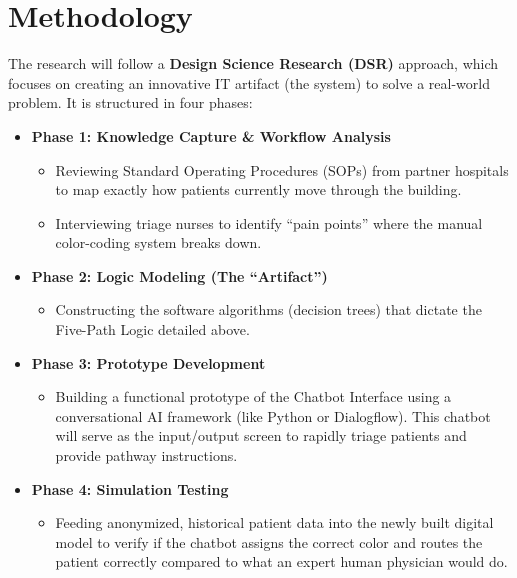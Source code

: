 \documentclass[12pt, a4paper]{article}
\begin{document}
	\section{Methodology}
	The research will follow a \textbf{Design Science Research (DSR)} approach, which focuses on creating an innovative IT artifact (the system) to solve a real-world problem. It is structured in four phases:
	
	\begin{itemize}
		\item \textbf{Phase 1: Knowledge Capture \& Workflow Analysis}
		\begin{itemize}
			\item Reviewing Standard Operating Procedures (SOPs) from partner hospitals to map exactly how patients currently move through the building.
			\item Interviewing triage nurses to identify ``pain points'' where the manual color-coding system breaks down.
		\end{itemize}
		
		\item \textbf{Phase 2: Logic Modeling (The ``Artifact'')}
		\begin{itemize}
			\item Constructing the software algorithms (decision trees) that dictate the Five-Path Logic detailed above.
		\end{itemize}
		
		\item \textbf{Phase 3: Prototype Development}
		\begin{itemize}
			\item Building a functional prototype of the Chatbot Interface using a conversational AI framework (like Python or Dialogflow). This chatbot will serve as the input/output screen to rapidly triage patients and provide pathway instructions.
		\end{itemize}
		
		\item \textbf{Phase 4: Simulation Testing}
		\begin{itemize}
			\item Feeding anonymized, historical patient data into the newly built digital model to verify if the chatbot assigns the correct color and routes the patient correctly compared to what an expert human physician would do.
		\end{itemize}
	\end{itemize}
	
\end{document}
